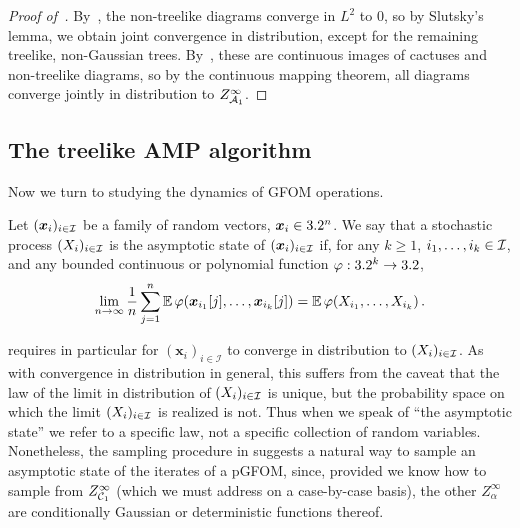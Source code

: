 \begin{proof}[Proof of~]
By~, the non-treelike diagrams converge in $L^2$ to 0,
so by Slutsky's lemma, we obtain joint
convergence in distribution, except for the remaining treelike, non-Gaussian trees. By~, these are continuous images
of cactuses and non-treelike diagrams, so
by the continuous mapping theorem, all
diagrams
converge jointly in distribution to $Z^\infty_{{\cal A}_1}$.
\end{proof}



\subsection{The treelike AMP algorithm}

Now we turn to studying the dynamics of GFOM operations.

\begin{definition}\label{def:asymptotic-state}
    Let $(\bm x_i)_{i\in {\cal I}}$ be a
    family of random vectors,
    $\bm x_i\in 3.2^{n}$.
    We say that a stochastic process $(X_i)_{i\in {\cal I}}$
    is the asymptotic state of $(\bm x_i)_{i\in {\cal I}}$ if, for any $k\ge 1$, $i_1, \ldots, i_k\in {\cal I}$, and any bounded continuous
    or polynomial function $\varphi:3.2^k\to 3.2$,
    \begin{equation}
        \lim_{n\to\infty} \frac 1n \sum_{j=1}^n \operatorname*{\mathbb{E}}\varphi(\bm x_{i_1}[j], \ldots, \bm x_{i_k}[j]) = \operatorname*{\mathbb{E}}\varphi(X_{i_1}, \ldots, X_{i_k})\,.\label{eq:defAsymptoticState}
    \end{equation}
\end{definition}

\noindent {} requires in particular for $(\bm x_i)_{i\in \mathcal I}$ to converge in distribution to $(X_i)_{i\in {\cal I}}$. 
As with convergence in distribution in general, this suffers from the caveat that the law of the limit in distribution of $(X_i)_{i\in {\cal I}}$ is unique, but the probability space on which the limit $(X_i)_{i\in {\cal I}}$ is realized is not.
Thus when we speak of ``the asymptotic state'' we refer to a specific law, not a specific collection of random variables.
Nonetheless, the sampling procedure in  suggests a natural
way to sample an asymptotic state of the
iterates of a pGFOM, since, provided we know how to sample from $Z_{{\cal C}_1}^{\infty}$ (which we must address on a case-by-case basis), the other $Z_{\alpha}^{\infty}$ are conditionally Gaussian or deterministic functions thereof.


